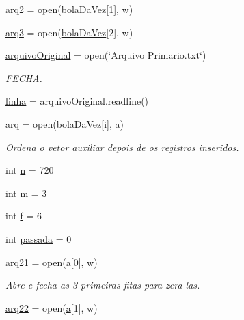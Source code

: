 \begin{DoxyCompactItemize}
\hyperlink{namespacemain_aa46a3cc27be1d87d4cd439ea3fb0f99e}{arq2} = open(\hyperlink{namespacemain_a1a062cd836b3711b8674874524bf97dc}{bola\+Da\+Vez}\mbox{[}1\mbox{]}, \textquotesingle{}w\textquotesingle{})
\item 
\hyperlink{namespacemain_a7feff388fb6011e74160375abce4a8b0}{arq3} = open(\hyperlink{namespacemain_a1a062cd836b3711b8674874524bf97dc}{bola\+Da\+Vez}\mbox{[}2\mbox{]}, \textquotesingle{}w\textquotesingle{})
\item 
\hyperlink{namespacemain_a69f6c2f75d72bb66d07872728896db46}{arquivo\+Original} = open(\char`\"{}Arquivo Primario.\+txt\char`\"{})
\begin{DoxyCompactList}\small\item\em F\+E\+C\+HA. \end{DoxyCompactList}\item 
\hyperlink{namespacemain_aa9194e3c86ce7146cfba8baf710894b8}{linha} = arquivo\+Original.\+readline()
\item 
\hyperlink{namespacemain_a5bf6c828ddc1cb2c35f0633f52b44f91}{arq} = open(\hyperlink{namespacemain_a1a062cd836b3711b8674874524bf97dc}{bola\+Da\+Vez}\mbox{[}\hyperlink{namespacemain_ade6e2febf33b88a767c2e85902add210}{i}\mbox{]}, \textquotesingle{}\hyperlink{namespacemain_aa164244f9ef98d3941710f56dae766dc}{a}\textquotesingle{})
\begin{DoxyCompactList}\small\item\em Ordena o vetor auxiliar depois de os registros inseridos. \end{DoxyCompactList}\item 
int \hyperlink{namespacemain_ad1293b340a9cdf1c72fff26349ffd01b}{n} = 720
\item 
int \hyperlink{namespacemain_a50c080bda584bdba1da281d098982aef}{m} = 3
\item 
int \hyperlink{namespacemain_a8a078ca3f8b803e56f253dbe7a70d93c}{f} = 6
\item 
int \hyperlink{namespacemain_a457d8cc2a11d76334da726a2dd1e5218}{passada} = 0
\item 
\hyperlink{namespacemain_aa218c5e81c47f70fd7ecb1018d22da60}{arq21} = open(\hyperlink{namespacemain_aa164244f9ef98d3941710f56dae766dc}{a}\mbox{[}0\mbox{]}, \textquotesingle{}w\textquotesingle{})
\begin{DoxyCompactList}\small\item\em Abre e fecha as 3 primeiras fitas para zera-\/las. \end{DoxyCompactList}\item 
\hyperlink{namespacemain_a1ba454b0949959e89f19ead972eefaa3}{arq22} = open(\hyperlink{namespacemain_aa164244f9ef98d3941710f56dae766dc}{a}\mbox{[}1\mbox{]}, \textquotesingle{}w\textquotesingle{})

\end{DoxyCompactItemize}
